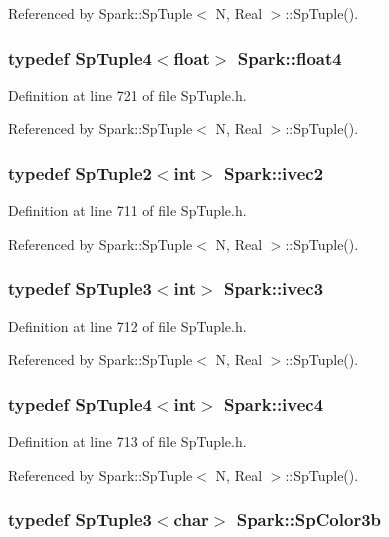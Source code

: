 Referenced by Spark::Sp\-Tuple$<$ N, Real $>$::Sp\-Tuple().
\subsubsection{\setlength{\rightskip}{0pt plus 5cm}typedef {\bf Sp\-Tuple4}$<$float$>$ {\bf Spark::float4}}\label{namespaceSpark_a18}


Definition at line 721 of file Sp\-Tuple.h.

Referenced by Spark::Sp\-Tuple$<$ N, Real $>$::Sp\-Tuple().
\subsubsection{\setlength{\rightskip}{0pt plus 5cm}typedef {\bf Sp\-Tuple2}$<$int$>$ {\bf Spark::ivec2}}\label{namespaceSpark_a10}


Definition at line 711 of file Sp\-Tuple.h.

Referenced by Spark::Sp\-Tuple$<$ N, Real $>$::Sp\-Tuple().
\subsubsection{\setlength{\rightskip}{0pt plus 5cm}typedef {\bf Sp\-Tuple3}$<$int$>$ {\bf Spark::ivec3}}\label{namespaceSpark_a11}


Definition at line 712 of file Sp\-Tuple.h.

Referenced by Spark::Sp\-Tuple$<$ N, Real $>$::Sp\-Tuple().
\subsubsection{\setlength{\rightskip}{0pt plus 5cm}typedef {\bf Sp\-Tuple4}$<$int$>$ {\bf Spark::ivec4}}\label{namespaceSpark_a12}


Definition at line 713 of file Sp\-Tuple.h.

Referenced by Spark::Sp\-Tuple$<$ N, Real $>$::Sp\-Tuple().
\subsubsection{\setlength{\rightskip}{0pt plus 5cm}typedef {\bf Sp\-Tuple3}$<$char$>$ {\bf Spark::Sp\-Color3b}}\label{namespaceSpark_a22}


